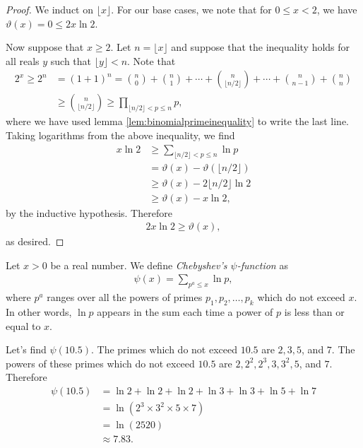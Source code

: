 	\begin{proof}
		We induct on $\lfloor x \rfloor$. For our base cases, we note that for $0 \le x < 2$, we have $\vartheta(x) = 0 \leq 2x \ln 2$.
		
		Now suppose that $x \geq 2$. Let $n = \lfloor x \rfloor$ and suppose that the inequality holds for all reals $y$ such that $\lfloor y \rfloor <n$. Note that
			\begin{align*}
				2^x \geq 2^n &= (1+1)^n = \binom{n}{0} + \binom{n}{1} + \cdots + \binom{n}{\lfloor n/2 \rfloor} + \cdots + \binom{n}{n-1} +‌\binom{n}{n}\\
					&\geq  \binom{n}{\lfloor n/2 \rfloor} \geq \prod_{\lfloor n/2 \rfloor < p \leq n} p,
			\end{align*} 
		where we have used lemma \eqref{lem:binomialprimeinequality} to write the last line. Taking logarithms from the above inequality, we find
			\begin{align*}
				x \ln 2 &\geq \sum_{\lfloor n/2 \rfloor < p \le n} \ln p \\
						 &= \vartheta(x) - \vartheta(\lfloor n/2 \rfloor) \\
						 &\geq \vartheta(x) - 2\lfloor n/2 \rfloor \ln 2 \\
						 &\geq \vartheta(x) - x \ln 2,
			\end{align*}
		by the inductive hypothesis. Therefore 
			\begin{align*}
				2x \ln 2 \ge \vartheta(x),
			\end{align*}
		as desired.
	\end{proof}
	
	\begin{definition}
		Let $x>0$ be a real number. We define \textit{Chebyshev's $\psi$-function} as
			\begin{align*}
				\psi(x) = \sum_{p^a \leq x} \ln p,
			\end{align*}
		where $p^a$ ranges over all the powers of primes $p_1, p_2, \ldots, p_k$ which do not exceed $x$. In other words, $\ln p$ appears in the sum each time a power of $p$ is less than or equal to $x$.
	\end{definition}
	
	\begin{example}
		Let's find $\psi(10.5)$. The primes which do not exceed $10.5$ are $2,3,5$, and $7$. The powers of these primes which do not exceed $10.5$ are $2, 2^2, 2^3, 3, 3^2, 5$, and $7$. Therefore
			\begin{align*}
				\psi(10.5) &= \ln 2 + \ln 2 + \ln 2 +\ln 3 + \ln 3+ \ln 5 + \ln 7\\
						   &= \ln(2^3 \times  3^2 \times 5 \times 7)\\
						   &=\ln(2520)\\
						   &\approx 7.83.
			\end{align*}
	\end{example}
	
